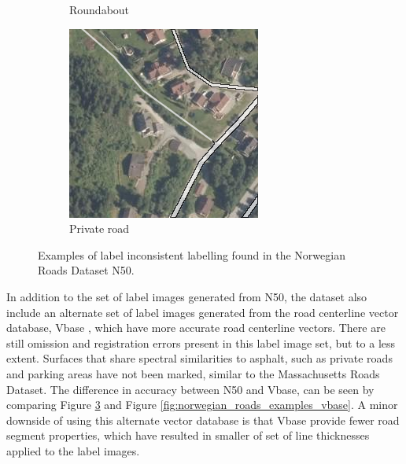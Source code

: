 \begin{figure}[h]
\begin{subfigure}{0.31\textwidth}
\caption{Roundabout} \label{fig:norwegian_roads_roundabout_n50}
\end{subfigure}
\hspace*{\fill} %
\begin{subfigure}{0.31\textwidth}
\includegraphics[width=\linewidth]{figs/datasets/nor_examples/1157_missing_n50.png}
\caption{Private road} \label{fig:norwegian_roads_missing_n50}
\end{subfigure}
\hspace*{\fill} %
\caption{Examples of label inconsistent labelling found in the Norwegian Roads Dataset N50.} \label{fig:norwegian_roads_examples_n50}
\end{figure}

In addition to the set of label images generated from N50, the dataset also include an alternate set of label images generated from the road centerline vector database, Vbase \citep{Kartverket_vbase}, which have more accurate road centerline vectors. There are still omission and registration errors present in this label image set, but to a less extent. Surfaces that share spectral similarities to asphalt, such as private roads and parking areas have not been marked, similar to the Massachusetts Roads Dataset. The difference in accuracy between N50 and Vbase, can be seen by comparing Figure \ref{fig:norwegian_roads_examples_n50} and Figure \ref{fig:norwegian_roads_examples_vbase}. A minor downside of using this alternate vector database is that Vbase provide fewer road segment properties, which have resulted in smaller of set of line thicknesses applied to the label images.\\

